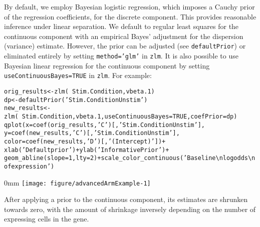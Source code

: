 \documentclass{article}\usepackage[]{graphicx}\usepackage[usenames,dvipsnames]{color}
\makeatletter
\def\maxwidth{ %
  \ifdim\Gin@nat@width>\linewidth
    \linewidth
  \else
    \Gin@nat@width
  \fi
}
\newcommand{\hlnum}[1]{\textcolor[rgb]{0.816,0.125,0.439}{#1}}%
\newcommand{\hlstr}[1]{\textcolor[rgb]{0.251,0.627,0.251}{#1}}%
\newcommand{\hlopt}[1]{\textcolor[rgb]{0,0,0}{#1}}%
\newcommand{\hlstd}[1]{\textcolor[rgb]{0.251,0.251,0.251}{#1}}%
\newcommand{\hlkwb}[1]{\textcolor[rgb]{0,0,0}{#1}}%
\newcommand{\hlkwc}[1]{\textcolor[rgb]{0.251,0.251,0.251}{#1}}%
\newcommand{\hlkwd}[1]{\textcolor[rgb]{0.878,0.439,0.125}{#1}}%
\newenvironment{knitrout}{}{} %
\makeatother
\begin{document}
By default, we employ Bayesian logistic regression, which imposes a Cauchy prior of the regression coefficients, for the discrete component.  This provides reasonable inference under linear separation.
We default to regular least squares for the continuous component with an empirical Bayes' adjustment for the dispersion (variance) estimate.
However, the prior can be adjusted (see \texttt{defaultPrior}) or eliminated entirely by setting \texttt{method='glm'} in \texttt{zlm}.
It is also possible to use Bayesian linear regression for the continuous component by setting \texttt{useContinuousBayes=TRUE} in \texttt{zlm}.
For example:
\begin{knitrout}
\color{fgcolor}\begin{kframe}
\begin{alltt}
 \hlstd{orig_results} \hlkwb{<-} \hlkwd{zlm}\hlstd{(}\hlopt{~}\hlstd{Stim.Condition, vbeta.1)}
 \hlstd{dp} \hlkwb{<-} \hlkwd{defaultPrior}\hlstd{(}\hlstr{'Stim.ConditionUnstim'}\hlstd{)}
 \hlstd{new_results} \hlkwb{<-}  \hlkwd{zlm}\hlstd{(}\hlopt{~}\hlstd{Stim.Condition, vbeta.1,} \hlkwc{useContinuousBayes}\hlstd{=}\hlnum{TRUE}\hlstd{,}\hlkwc{coefPrior}\hlstd{=dp)}
 \hlkwd{qplot}\hlstd{(}\hlkwc{x}\hlstd{=}\hlkwd{coef}\hlstd{(orig_results,} \hlstr{'C'}\hlstd{)[,} \hlstr{'Stim.ConditionUnstim'}\hlstd{],}
       \hlkwc{y}\hlstd{=}\hlkwd{coef}\hlstd{(new_results,} \hlstr{'C'}\hlstd{)[,} \hlstr{'Stim.ConditionUnstim'}\hlstd{],}
       \hlkwc{color}\hlstd{=}\hlkwd{coef}\hlstd{(new_results,} \hlstr{'D'}\hlstd{)[,}\hlstr{'(Intercept)'}\hlstd{])} \hlopt{+}
     \hlkwd{xlab}\hlstd{(}\hlstr{'Default prior'}\hlstd{)} \hlopt{+} \hlkwd{ylab}\hlstd{(}\hlstr{'Informative Prior'}\hlstd{)} \hlopt{+}
     \hlkwd{geom_abline}\hlstd{(}\hlkwc{slope}\hlstd{=}\hlnum{1}\hlstd{,} \hlkwc{lty}\hlstd{=}\hlnum{2}\hlstd{)} \hlopt{+} \hlkwd{scale_color_continuous}\hlstd{(}\hlstr{'Baseline\textbackslash{}nlog odds\textbackslash{}nof expression'}\hlstd{)}
\end{alltt}
\end{kframe}\begin{adjustwidth}{\fltoffset}{0mm}
\texttt{[image: figure/advancedArmExample-1]} \end{adjustwidth}
\end{knitrout}
After applying a prior to the continuous component, its estimates are shrunken towards zero, with the amount of shrinkage inversely depending on the number of expressing cells in the gene.
\end{document}
